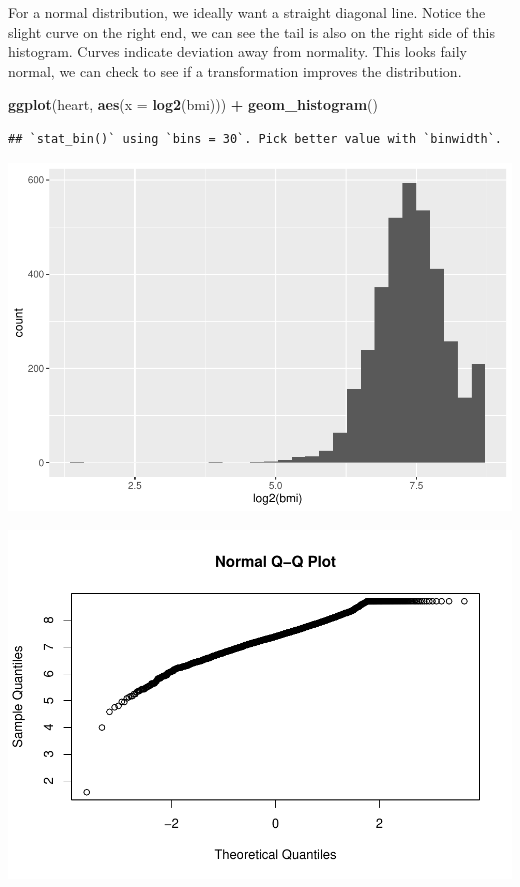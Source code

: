 \documentclass[
]{book}
\newenvironment{Shaded}{\begin{snugshade}}{\end{snugshade}}
\newcommand{\AttributeTok}[1]{\textcolor[rgb]{0.13,0.29,0.53}{#1}}
\newcommand{\FunctionTok}[1]{\textcolor[rgb]{0.13,0.29,0.53}{\textbf{#1}}}
\newcommand{\NormalTok}[1]{#1}
\newcommand{\SpecialCharTok}[1]{\textcolor[rgb]{0.81,0.36,0.00}{\textbf{#1}}}
\begin{document}
For a normal distribution, we ideally want a straight diagonal line. Notice the slight curve on the right end, we can see the tail is also on the right side of this histogram. Curves indicate deviation away from normality. This looks faily normal, we can check to see if a transformation improves the distribution.

\begin{Shaded}
\begin{Highlighting}[]
\FunctionTok{ggplot}\NormalTok{(heart, }\FunctionTok{aes}\NormalTok{(}\AttributeTok{x =} \FunctionTok{log2}\NormalTok{(bmi))) }\SpecialCharTok{+} 
  \FunctionTok{geom\_histogram}\NormalTok{()}
\end{Highlighting}
\end{Shaded}

\begin{verbatim}
## `stat_bin()` using `bins = 30`. Pick better value with `binwidth`.
\end{verbatim}

\includegraphics{_main_files/figure-latex/unnamed-chunk-97-1.pdf}

\begin{Shaded}
\end{Shaded}

\includegraphics{_main_files/figure-latex/unnamed-chunk-97-2.pdf}
\end{document}
